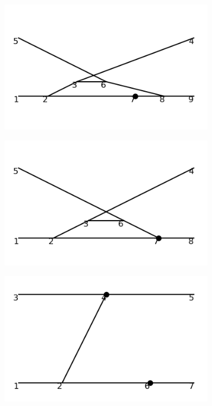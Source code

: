 \documentclass[11pt,a4paper,twoside,pdf]{article}
\numberwithin{equation}{section}
\begin{document}
\begin{figure}[h!]
\begin{subfigure}[t]{0.16\textwidth}
    \end{subfigure}
    \hfill
    \begin{subfigure}[t]{0.16\textwidth}
        \centering
        \includegraphics[width=\textwidth]{plots/order6_2to2/counterterms/4.png}
    \end{subfigure}
    \hfill
    \begin{subfigure}[t]{0.16\textwidth}
        \centering
        \includegraphics[width=\textwidth]{plots/order6_2to2/counterterms/5.png}
    \end{subfigure}
    \hfill
    \begin{subfigure}[t]{0.16\textwidth}
        \centering
        \includegraphics[width=\textwidth]{plots/order6_2to2/counterterms/6.png}

\end{subfigure}
\end{figure}
\end{document}
